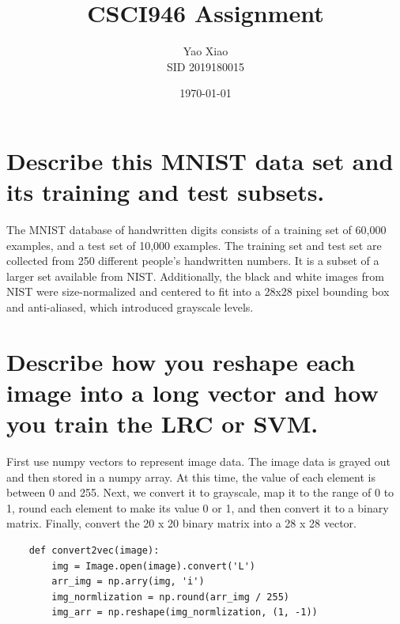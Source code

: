 \documentclass{article}
\title{CSCI946 Assignment}
\author{Yao Xiao \\ SID 2019180015}
\date{\today}
\begin{document}
\maketitle

\section{Describe this MNIST data set and its training and test subsets.}
The MNIST database of handwritten digits consists of a training set of 60,000 examples, and a test set of 10,000 examples. 
The training set and test set are collected from 250 different people's handwritten numbers.
It is a subset of a larger set available from NIST. Additionally, the black and white images from NIST were size-normalized and centered to fit into a 28x28 pixel bounding box and anti-aliased, which introduced grayscale levels.

\section{Describe how you reshape each image into a long vector and how you train the LRC or SVM.}
First use numpy vectors to represent image data. The image data is grayed out and then stored in a numpy array. At this time, the value of each element is between 0 and 255. Next, we convert it to grayscale, map it to the range of 0 to 1, round each element to make its value 0 or 1, and then convert it to a binary matrix. Finally, convert the 20 x 20 binary matrix into a 28 x 28 vector.

\begin{lstlisting}
    def convert2vec(image):
        img = Image.open(image).convert('L')
        arr_img = np.arry(img, 'i')
        img_normlization = np.round(arr_img / 255)
        img_arr = np.reshape(img_normlization, (1, -1))
\end{lstlisting}
\end{document}
